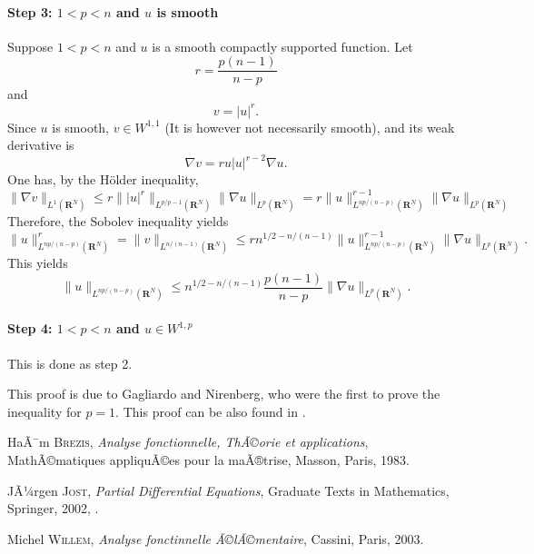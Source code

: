 \documentclass[12pt]{article}
\begin{document}
\paragraph{Step 3: $1<p <n$ and $u$ is smooth}
Suppose $1 <p <n $ and $u$ is a smooth compactly supported function. 
Let 
\[
  r=\frac{p(n-1)}{n-p}
\]
and
\[
  v=\lvert u \rvert^r.
\]
Since $u$ is smooth, $v \in W^{1,1}$ (It is however not necessarily smooth), and its weak derivative is
\[
  \nabla v=r u \lvert u \rvert^{r-2} \nabla u.
\]
One has, by the H\"older inequality,
\[
  \rVert \nabla v \lVert_{L^1(\mathbf{R}^N)}\le r \rVert \lvert u\rvert^r \lVert_{L^{p/p-1}(\mathbf{R}^N)}\rVert \nabla u \lVert_{L^{p}(\mathbf{R}^N)}
= r \rVert u \lVert_{L^{np/(n-p)}(\mathbf{R}^N)}^{r-1}\rVert \nabla u \lVert_{L^{p}(\mathbf{R}^N)}
\]
Therefore, the Sobolev inequality yields
\[
  \rVert u \lVert_{L^{np/(n-p)}(\mathbf{R}^N)}^r
= \rVert v \lVert_{L^{n/(n-1)}(\mathbf{R}^N)}
\le r n^{1/2-n/(n-1)}\rVert u \lVert_{L^{np/(n-p)}(\mathbf{R}^N)}^{r-1}\rVert \nabla u \lVert_{L^{p}(\mathbf{R}^N)}.
\]
This yields
\[
  \rVert u \lVert_{L^{np/(n-p)}(\mathbf{R}^N)}
\le n^{1/2-n/(n-1)}\frac{p(n-1)}{n-p}\rVert \nabla u \lVert_{L^{p}(\mathbf{R}^N)}.
\]

\paragraph{Step 4: $1<p <n$ and $u\in W^{1,p}$}
This is done as step 2.

This proof is due to Gagliardo and Nirenberg, who were the first to prove the inequality for $p=1$. This proof can be also found in \cite{HB,JJ,MW}.

\begin{thebibliography}{99}
 HaÃ¯m \textsc{Brezis}, \emph{Analyse fonctionnelle, ThÃ©orie et applications}, MathÃ©matiques appliquÃ©es pour la maÃ®trise, Masson, Paris, 1983. 

 JÃ¼rgen \textsc{Jost}, \emph{Partial Differential Equations}, Graduate Texts in Mathematics,  Springer, 2002,  .

 Michel \textsc{Willem}, \emph{Analyse fonctinnelle Ã©lÃ©mentaire}, Cassini, Paris, 2003.
\end{thebibliography}
\end{document}
